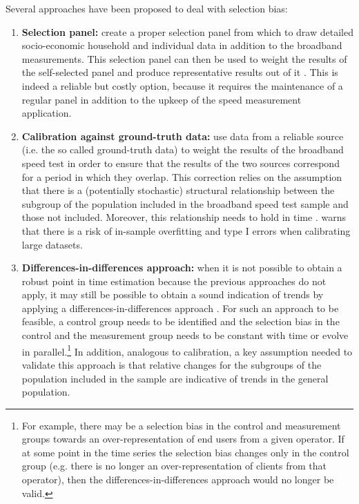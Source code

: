 \documentclass[12pt]{article}
\begin{document}
Several approaches have been proposed to deal with selection bias:

\begin{enumerate}

	\item \textbf{Selection panel:} create a proper selection panel from which to draw detailed socio-economic household and individual data in addition to the broadband measurements. This selection panel can then be used to weight the results of the self-selected panel and produce representative results out of it \citep{opt2012}. This is indeed a reliable but costly option, because it requires the maintenance of a regular panel in addition to the upkeep of the speed measurement application.
	
	\item \textbf{Calibration against ground-truth data:} use data from a reliable source (i.e. the so called ground-truth data) to weight the results of the broadband speed test in order to ensure that the results of the two sources correspond for a period in which they overlap.  This correction relies on the assumption that there is a (potentially stochastic) structural relationship between the subgroup of the population included in the broadband speed test sample and those not included. Moreover, this relationship needs to hold in time \citep{zagheni2015}. \cite{couper2013} warns that there is a risk of in-sample overfitting and type I errors when calibrating large datasets.
	
	\item \textbf{Differences-in-differences approach:} when it is not possible to obtain a robust point in time estimation because the previous approaches do not apply, it may still be possible to obtain a sound indication of trends by applying a differences-in-differences approach \citep{zagheni2015}. For such an approach to be feasible, a control group needs to be identified and the selection bias in the control and the measurement group needs to be constant with time or evolve in parallel.\footnote{For example, there may be a selection bias in the control and measurement groups towards an over-representation of end users from a given operator. If at some point in the time series the selection bias changes only in the control group (e.g. there is no longer an over-representation of clients from that operator), then the differences-in-differences approach would no longer be valid.} In addition, analogous to calibration, a key assumption needed to validate this approach is that relative changes for the subgroups of the population included in the sample are indicative of trends in the general population.         

\end{enumerate}  
\end{document}
